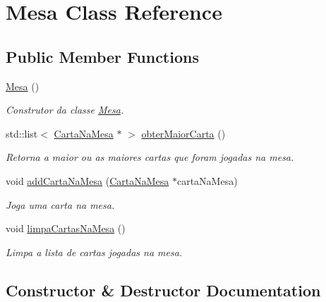 \hypertarget{class_mesa}{}\section{Mesa Class Reference}
\label{class_mesa}
\subsection*{Public Member Functions}
\begin{DoxyCompactItemize}
\item 
\mbox{\hyperlink{class_mesa_a98794038db53804cb4295480c96b2c20}{Mesa}} ()
\begin{DoxyCompactList}\small\item\em Construtor da classe \mbox{\hyperlink{class_mesa}{Mesa}}. \end{DoxyCompactList}\item 
std\+::list$<$ \mbox{\hyperlink{class_carta_na_mesa}{Carta\+Na\+Mesa}} $\ast$ $>$ \mbox{\hyperlink{class_mesa_a3c48d9d5efdc8b26956245abb4c568ef}{obter\+Maior\+Carta}} ()
\begin{DoxyCompactList}\small\item\em Retorna a maior ou as maiores cartas que foram jogadas na mesa. \end{DoxyCompactList}\item 
void \mbox{\hyperlink{class_mesa_a9678402ee3dac7430aae29269cc88138}{add\+Carta\+Na\+Mesa}} (\mbox{\hyperlink{class_carta_na_mesa}{Carta\+Na\+Mesa}} $\ast$carta\+Na\+Mesa)
\begin{DoxyCompactList}\small\item\em Joga uma carta na mesa. \end{DoxyCompactList}\item 
void \mbox{\hyperlink{class_mesa_a77676cb0d95846a226ee905b8e5fcb53}{limpa\+Cartas\+Na\+Mesa}} ()
\begin{DoxyCompactList}\small\item\em Limpa a lista de cartas jogadas na mesa. \end{DoxyCompactList}\end{DoxyCompactItemize}


\subsection{Constructor \& Destructor Documentation}
\mbox{\label{class_mesa_a98794038db53804cb4295480c96b2c20}} 
